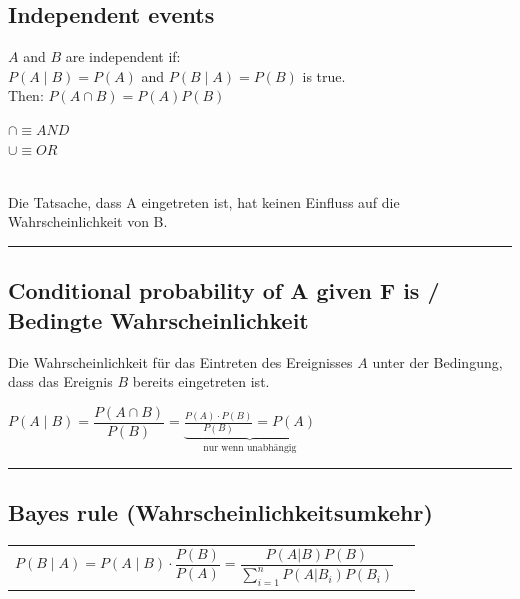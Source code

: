 	\subsection{Independent events }
		\begin{minipage}{12cm}
			$A$ and $B$ are independent if:\\
			
			$P(A \mid B)=P(A)$ and $P(B \mid A)=P(B)$ is true.\\
			
			Then: \hspace*{8mm} $P(A\cap B)=P(A)P(B)$\\
		\end{minipage}
		\begin{minipage}{4cm}
			$ \cap \equiv AND $ \\
			$ \cup \equiv OR $\newline
		\end {minipage}\\
    	Die Tatsache, dass A eingetreten ist, hat keinen Einfluss auf die 
		Wahrscheinlichkeit von B.\\ 

		\vspace{2mm}
		\hrule
		\vspace{3mm}
		
	\subsection{Conditional probability of A given F is / Bedingte Wahrscheinlichkeit }
		Die Wahrscheinlichkeit für das Eintreten des Ereignisses $A$ unter der
		Bedingung, dass das Ereignis $B$ bereits eingetreten ist.
		\begin{center}
		$P(A\mid B)= \dfrac{P(A\cap B)}{P(B)}=\underbrace{\frac{P(A)\cdot
		P(B)}{P(B)}=P(A)}_{\text{nur wenn unabhängig}}$ 
		\end{center}

	\vspace{2mm}
	\hrule
	\vspace{3mm}

\subsection{Bayes rule (Wahrscheinlichkeitsumkehr) }
		\begin{tabular}{ll}
		  $P(B\mid A)=P(A\mid B) \cdot\dfrac{P(B)}{P(A)} = \dfrac{P(A|B) P(B)}{\sum\limits_{i=1}^n P(A|B_i) P(B_i)}$\vspace{1mm}
		\end{tabular}
		
